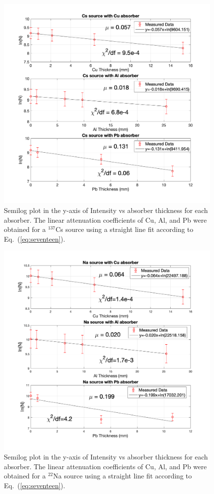 \documentclass[%
 aip,
rsi,%
 amsmath,amssymb,
 reprint,%
author-numerical,%
]{revtex4-1}
\begin{document}
\begin{figure}[H]
\centering
\includegraphics[width=1.05\linewidth]{lateximages/cs137atten.png} 
\caption{\label{fig:cs137attenuation} Semilog plot in the y-axis of Intensity vs absorber thickness for each absorber. The linear attenuation coefficients of Cu, Al, and Pb were obtained for a $^ {137 }$Cs source using a straight line fit according to Eq.~(\ref{eq:seventeen}). }
\end{figure}

\begin{figure}[H]
\centering
\includegraphics[width=1.05\linewidth]{lateximages/na22attenuation.png} 
\caption{\label{fig:na22attenuation} Semilog plot in the y-axis of Intensity vs absorber thickness for each absorber. The linear attenuation coefficients of Cu, Al, and Pb were obtained for a $^ {22 }$Na source using a straight line fit according to Eq.~(\ref{eq:seventeen}).}
\end{figure}
\end{document}
